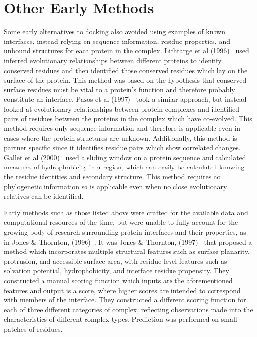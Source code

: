 \section{Other Early Methods}

Some early alternatives to docking also avoided using examples of known interfaces, instead relying on sequence information, residue properties, and unbound structures for each protein in the complex.
Lichtarge et al (1996)~\cite{lichtarge1996} used inferred evolutionary relationships between different proteins to identify conserved residues and then identified those conserved residues which lay on the surface of the protein.
This method was based on the hypothesis that conserved surface residues must be vital to a protein's function and therefore probably constitute an interface.
Pazos et al (1997)~\cite{pazos1997} took a similar approach, but instead looked at evolutionary relationships between protein complexes and identified pairs of residues between the proteins in the complex which have co-evolved.
This method requires only sequence information and therefore is applicable even in cases where the protein structures are unknown. 
Additionally, this method is partner specific since it identifies residue pairs which show correlated changes.
Gallet et al (2000)~\cite{gallet2000} used a sliding window on a protein sequence and calculated measures of hydrophobicity in a region, which can easily be calculated knowing the residue identities and secondary structure.
This method requires no phylogenetic information so is applicable even when no close evolutionary relatives can be identified.

Early methods such as those listed above were crafted for the available data and computational resources of the time, but were unable to fully account for the growing body of research surrounding protein interfaces and their properties, as in Jones \& Thornton, (1996)~\cite{jones1996}.
It was Jones \& Thornton, (1997)~\cite{jones1997} that proposed a method which incorporates multiple structural features such as surface planarity, protrusion, and accessible surface area, with residue level features such as solvation potential, hydrophobicity, and interface residue propensity.
They constructed a manual scoring function which inputs are the aforementioned features and output is a score, where higher scores are intended to correspond with members of the interface.
They constructed a different scoring function for each of three different categories of complex, reflecting observations made into the characteristics of different complex types.
Prediction was performed on small patches of residues.

